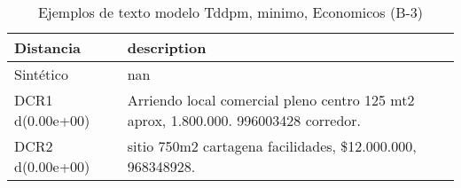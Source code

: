 \begin{table}[H]
\centering
\fontsize{10}{14}\selectfont
\caption{Ejemplos de texto modelo Tddpm, minimo, Economicos (B-3)}
\label{table-example-economicos-b-3-tddpm_mlp-min-text}
\begin{tabular}{|l|m{35em}|}
\hline
\rowcolor[gray]{0.8}
Distancia & description \\
\hline Sintético & nan \\
\hline DCR1 d(0.00e+00) & Arriendo local comercial pleno centro 125 mt2 aprox, 1.800.000. 996003428 corredor. \\
\hline DCR2 d(0.00e+00) & sitio 750m2 cartagena facilidades, \$12.000.000, 968348928. \\
\hline
\end{tabular}
\end{table}

